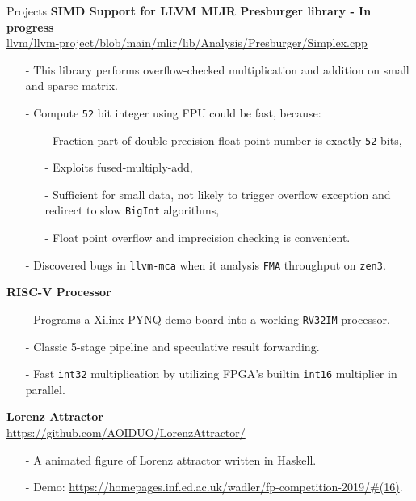 \documentclass{resume} %
\newcommand{\itemsepval}{-6pt}
\newcommand{\code}{\texttt}
\begin{document}
\begin{rSection}{Projects}
    \textbf{SIMD Support for LLVM MLIR Presburger library - In progress} \hfill \\
    \url{llvm/llvm-project/blob/main/mlir/lib/Analysis/Presburger/Simplex.cpp} \hfill \par
    \begin{itemize}
        \itemsep \itemsepval {} 
        \item[-] This library performs overflow-checked multiplication and addition on small and sparse matrix. 
        \item[-] Compute \code{52} bit integer using FPU could be fast, because: 
        \begin{itemize}
            \itemsep \itemsepval {} 
            \item[-] Fraction part of double precision float point number is exactly \code{52} bits,
            \item[-] Exploits fused-multiply-add,
            \item[-] Sufficient for small data, not likely to trigger overflow exception and redirect to slow \code{BigInt} algorithms, 
            \item[-] Float point overflow and imprecision checking is convenient.
        \end{itemize}
    \item[-] Discovered bugs in \code{llvm-mca} when it analysis \code{FMA} throughput on \code{zen3}. 
    \end{itemize}

    \textbf{RISC-V Processor} \par
    \begin{itemize}
        \itemsep \itemsepval {} 
        \item[-] Programs a Xilinx PYNQ demo board into a working \code{RV32IM} processor.
        \item[-] Classic 5-stage pipeline and speculative result forwarding.
        \item[-] Fast \code{int32} multiplication by utilizing FPGA's builtin \code{int16} multiplier in parallel.
    \end{itemize}
    
    \textbf{Lorenz Attractor} \hfill \\
    \url{https://github.com/AOIDUO/LorenzAttractor/} \hfill \par
    \begin{itemize}
        \itemsep \itemsepval {} 
        \item[-] A animated figure of Lorenz attractor written in Haskell.
        \item[-] Demo: \url{https://homepages.inf.ed.ac.uk/wadler/fp-competition-2019/#(16)}.
    \end{itemize}


\end{rSection}
\end{document}
